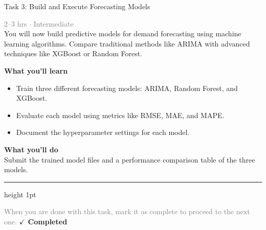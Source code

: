 \documentclass[10pt,a4paper]{article}
\begin{document}
\begin{taskbox}{Task 3: Build and Execute Forecasting Models}

    {\small \textcolor{gray}{2--3 hrs $\cdot$ Intermediate}}\\[12pt]

      
You will now build predictive models for demand forecasting using machine learning algorithms. Compare traditional methods like ARIMA with advanced techniques like XGBoost or Random Forest.  


\vspace{8pt}
{\large \textbf{\textcolor{brandLight}{What you'll learn}}}\\[4pt]  
\begin{itemize}
    \item Train three different forecasting models: ARIMA, Random Forest, and XGBoost.  
    \item Evaluate each model using metrics like RMSE, MAE, and MAPE.  
    \item Document the hyperparameter settings for each model.  
\end{itemize}

\vspace{8pt}
{\large \textbf{\textcolor{brandLight}{What you'll do}}}\\[4pt]  
Submit the trained model files and a performance comparison table of the three models.\par

    \vspace{16pt}

    \textcolor{cardBorder}{\hrule height 1pt}\vspace{8pt}

    \small \textcolor{gray}{When you are done with this task, mark it as complete to proceed to the next one.} \hfill \textbf{\textcolor{brandDark}{$\checkmark$ Completed}}

\end{taskbox}
\end{document}
